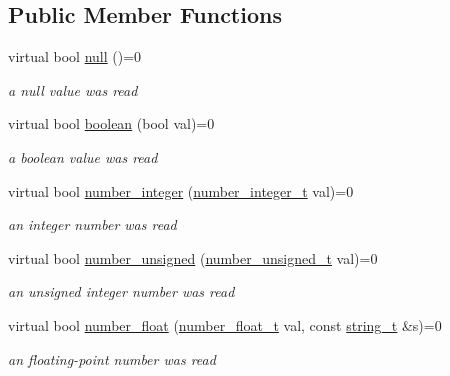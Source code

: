 \subsection*{Public Member Functions}
\begin{DoxyCompactItemize}
\item 
virtual bool \mbox{\hyperlink{structnlohmann_1_1json__sax_a0ad26edef3f8d530dcec3192bba82df6}{null}} ()=0
\begin{DoxyCompactList}\small\item\em a null value was read \end{DoxyCompactList}\item 
virtual bool \mbox{\hyperlink{structnlohmann_1_1json__sax_a82ed080814fa656191a537284bb0c575}{boolean}} (bool val)=0
\begin{DoxyCompactList}\small\item\em a boolean value was read \end{DoxyCompactList}\item 
virtual bool \mbox{\hyperlink{structnlohmann_1_1json__sax_affa7a78b8e9cc9cc3ac99927143142a5}{number\+\_\+integer}} (\mbox{\hyperlink{structnlohmann_1_1json__sax_a0cef30121f02b7fee85e9708148ea0aa}{number\+\_\+integer\+\_\+t}} val)=0
\begin{DoxyCompactList}\small\item\em an integer number was read \end{DoxyCompactList}\item 
virtual bool \mbox{\hyperlink{structnlohmann_1_1json__sax_ad9b253083e0509923ba195136f49face}{number\+\_\+unsigned}} (\mbox{\hyperlink{structnlohmann_1_1json__sax_a32028cc056ae0f43aaae331cdbbbf856}{number\+\_\+unsigned\+\_\+t}} val)=0
\begin{DoxyCompactList}\small\item\em an unsigned integer number was read \end{DoxyCompactList}\item 
virtual bool \mbox{\hyperlink{structnlohmann_1_1json__sax_ae7c31614e8a82164d2d7f8dbf4671b25}{number\+\_\+float}} (\mbox{\hyperlink{structnlohmann_1_1json__sax_a390c209bffd8c4800c8f3076dc465a20}{number\+\_\+float\+\_\+t}} val, const \mbox{\hyperlink{structnlohmann_1_1json__sax_ae01977a9f3c5b3667b7a2929ed91061e}{string\+\_\+t}} \&s)=0
\begin{DoxyCompactList}\small\item\em an floating-\/point number was read \end{DoxyCompactList}\item 

\end{DoxyCompactItemize}
